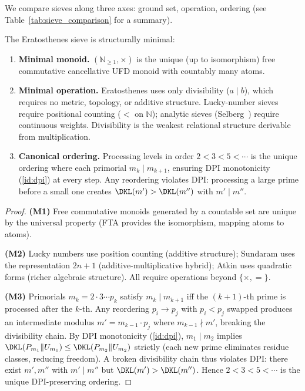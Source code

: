 \documentclass[12pt,a4paper]{article}
\begin{document}
We compare sieves along three axes: ground set, operation, ordering
(see Table~\ref{tab:sieve_comparison} for a summary).

\mTHM
\begin{theorem}
\label{thm:N3}
The Eratosthenes sieve is structurally minimal:
\begin{enumerate}[label=\textbf{(M\arabic*)}]
\item \textbf{Minimal monoid.} $(\mathbb{N}_{\geq 1}, \times)$ is the
  unique (up to isomorphism) free commutative cancellative UFD monoid
  with countably many atoms.
\item \textbf{Minimal operation.} Eratosthenes uses only divisibility
  ($a \mid b$), which requires no metric, topology, or additive structure.
  Lucky-number sieves require positional counting ($<$ on $\mathbb{N}$);
  analytic sieves (Selberg~\cite{Selberg1949}) require continuous weights. Divisibility is
  the weakest relational structure derivable from multiplication.
\item \textbf{Canonical ordering.} Processing levels in order $2 < 3 < 5 < \cdots$
  is the unique ordering where each primorial $m_k \mid m_{k+1}$,
  ensuring DPI monotonicity (\cref{id:dpi}) at every step. Any
  reordering violates DPI: processing a large prime before a small one
  creates $\DKL(m') > \DKL(m'')$ with $m' \mid m''$.
\end{enumerate}

\begin{proof}
\textbf{(M1)} Free commutative monoids generated by a countable set are
unique by the universal property (FTA provides the isomorphism, mapping
atoms to atoms).

\textbf{(M2)} Lucky numbers use position counting (additive structure);
Sundaram uses the representation $2n+1$ (additive-multiplicative hybrid);
Atkin uses quadratic forms (richer algebraic structure). All require
operations beyond $\{\times, =\}$.

\textbf{(M3)} Primorials $m_k = 2 \cdot 3 \cdots p_k$ satisfy $m_k \mid m_{k+1}$
iff the $(k+1)$-th prime is processed after the $k$-th. Any reordering
$p_i \to p_j$ with $p_i < p_j$ swapped produces an intermediate modulus
$m' = m_{k-1} \cdot p_j$ where $m_{k-1} \nmid m'$, breaking
the divisibility chain. By DPI monotonicity (\cref{id:dpi}),
$m_1 \mid m_2$ implies $\DKL(P_{m_1}\|U_{m_1}) \leq \DKL(P_{m_2}\|U_{m_2})$
strictly (each new prime eliminates residue classes, reducing freedom).
A broken divisibility chain thus violates DPI: there exist
$m', m''$ with $m' \mid m''$ but $\DKL(m') > \DKL(m'')$.
Hence $2 < 3 < 5 < \cdots$ is the unique DPI-preserving ordering.
\end{proof}
\end{theorem}
\end{document}
